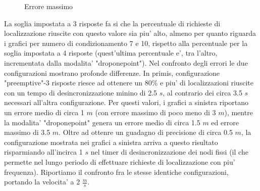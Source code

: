 \begin{figure}[H]
    \centering
    \hfill
    \caption{Errore massimo}
\end{figure}
La soglia impostata a 3 risposte fa si che la percentuale di richieste di localizzazione riuscite con questo valore sia piu' alto, almeno per quanto riguarda i grafici per numero di condizionamento 7 e 10, rispetto alla percentuale per la soglia impostata a 4 risposte (quest'ultima percentuale e', tra l'altro, incrementata dalla modalita' "droponepoint").
Nel confronto degli errori le due configurazioni mostrano profonde differenze. In primis, configurazione "preemptive"-3 risposte riesce ad ottenere un 80\% e piu' di localizzazioni riuscite con un tempo di desincronizzazione minino di 2.5 $s$, al contrario dei circa 3.5 $s$ necessari all'altra configurazione. Per questi valori, i grafici a sinistra riportano un errore medio di circa 1 $m$ (con errore massimo di poco meno di 3 $m$), mentre la modalita' "droponepoint" genera un errore medio di circa 1.5 $m$ ed errore massimo di 3.5 $m$.
Oltre ad ottenre un guadagno di precisione di circa 0.5 $m$, la configurazione mostrata nei grafici a sinistra arriva a questo risultato risparmiando all'incirca 1 $s$ nel timer di desincronizzazione dei nodi fissi (il che permette nel lungo periodo di effettuare richieste di localizzazione con piu' frequenza).
Riportiamo il confronto fra le stesse identiche configurazioni, portando la velocita' a 2 $\frac{m}{s}$.

